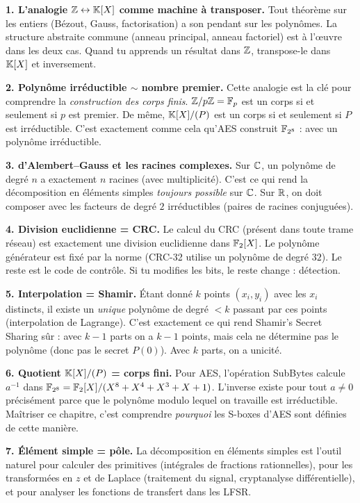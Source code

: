 \begin{intuitionbox}

\textbf{1. L'analogie $\mathbb{Z} \leftrightarrow \mathbb{K}[X]$ comme machine à transposer.} Tout théorème sur les entiers (Bézout, Gauss, factorisation) a son pendant sur les polynômes. La structure abstraite commune (anneau principal, anneau factoriel) est à l'\oe uvre dans les deux cas. Quand tu apprends un résultat dans $\mathbb{Z}$, transpose-le dans $\mathbb{K}[X]$ et inversement.

\textbf{2. Polynôme irréductible $\sim$ nombre premier.} Cette analogie est la clé pour comprendre la \emph{construction des corps finis}. $\mathbb{Z}/p\mathbb{Z} = \mathbb{F}_p$ est un corps si et seulement si $p$ est premier. De même, $\mathbb{K}[X]/(P)$ est un corps si et seulement si $P$ est irréductible. C'est exactement comme cela qu'AES construit $\mathbb{F}_{2^8}$ : avec un polynôme irréductible.

\textbf{3. d'Alembert--Gauss et les racines complexes.} Sur $\mathbb{C}$, un polynôme de degré $n$ a exactement $n$ racines (avec multiplicité). C'est ce qui rend la décomposition en éléments simples \emph{toujours possible} sur $\mathbb{C}$. Sur $\mathbb{R}$, on doit composer avec les facteurs de degré $2$ irréductibles (paires de racines conjuguées).

\textbf{4. Division euclidienne = CRC.} Le calcul du CRC (présent dans toute trame réseau) est exactement une division euclidienne dans $\mathbb{F}_2[X]$. Le polynôme générateur est fixé par la norme (CRC-32 utilise un polynôme de degré $32$). Le reste est le code de contrôle. Si tu modifies les bits, le reste change : détection.

\textbf{5. Interpolation = Shamir.} Étant donné $k$ points $(x_i, y_i)$ avec les $x_i$ distincts, il existe un \emph{unique} polynôme de degré $< k$ passant par ces points (interpolation de Lagrange). C'est exactement ce qui rend Shamir's Secret Sharing sûr : avec $k - 1$ parts on a $k - 1$ points, mais cela ne détermine pas le polynôme (donc pas le secret $P(0)$). Avec $k$ parts, on a unicité.

\textbf{6. Quotient $\mathbb{K}[X]/(P)$ = corps fini.} Pour AES, l'opération SubBytes calcule $a^{-1}$ dans $\mathbb{F}_{2^8} = \mathbb{F}_2[X]/(X^8 + X^4 + X^3 + X + 1)$. L'inverse existe pour tout $a \neq 0$ précisément parce que le polynôme modulo lequel on travaille est irréductible. Maîtriser ce chapitre, c'est comprendre \emph{pourquoi} les S-boxes d'AES sont définies de cette manière.

\textbf{7. Élément simple = pôle.} La décomposition en éléments simples est l'outil naturel pour calculer des primitives (intégrales de fractions rationnelles), pour les transformées en $z$ et de Laplace (traitement du signal, cryptanalyse différentielle), et pour analyser les fonctions de transfert dans les LFSR.
\end{intuitionbox}


